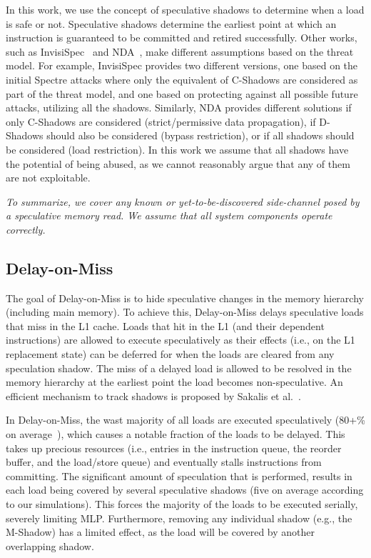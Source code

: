 In this work, we use the concept of speculative shadows to determine when a load is safe or not. Speculative shadows determine the earliest point at which an instruction is guaranteed to be committed and retired successfully. Other works, such as InvisiSpec~\cite{yan_invisispec:MICRO2018} and NDA~\cite{weisse2019nda}, make different assumptions based on the threat model. For example, InvisiSpec provides two different versions, one based on the initial Spectre attacks where only the equivalent of C-Shadows are considered as part of the threat model, and one based on protecting against all possible future attacks, utilizing all the shadows. Similarly, NDA provides different solutions if only C-Shadows are considered (strict/permissive data propagation), if D-Shadows should also be considered (bypass restriction), or if all shadows should be considered (load restriction). In this work we assume that all shadows have the potential of being abused, as we cannot reasonably argue that any of them are not exploitable.

{\em To summarize, 
we cover any known or yet-to-be-discovered side-channel posed by a speculative memory read. We assume that all system components operate correctly.}

\subsection{Delay-on-Miss}
\label{sec:dom-vp}
The goal of Delay-on-Miss is to hide speculative changes in the memory hierarchy (including main memory). 
To achieve this, Delay-on-Miss delays speculative loads that miss in the L1 cache. Loads that hit in the L1 (and their dependent instructions) are allowed to execute speculatively as their effects (i.e., on the L1 replacement state) can be deferred for when the loads are cleared from any speculation shadow. 
The miss of a delayed load is allowed to be resolved in the memory hierarchy at the earliest point the load becomes non-speculative. An efficient mechanism to track shadows is proposed by Sakalis et al.~\cite{sakalis+:ISCA2019vp}. 

In Delay-on-Miss, the wast majority of all loads are executed speculatively (80+\% on average~\cite{sakalis+:ISCA2019vp}), which causes a notable fraction of the loads to be delayed. This takes up precious resources (i.e., entries in the instruction queue, the reorder buffer, and the load/store queue) and eventually stalls instructions from committing. 
The significant amount of speculation that is performed, results in each load being covered by several speculative shadows (five on average according to our simulations). This forces the majority of the loads to be executed serially, severely limiting MLP. Furthermore, removing any individual shadow (e.g., the M-Shadow) has a limited effect, as the load will be covered by another overlapping shadow.

